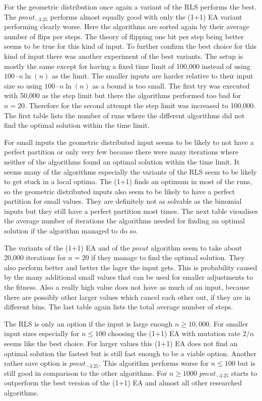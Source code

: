 For the geometric distribution once again a variant of the RLS performs the best.
The $pmut_{-3.25}$ performs almost equally good with only the (1+1) EA variant performing clearly worse.
Here the algorithms are sorted again by their average number of flips per steps.
The theory of flipping one bit per step being better seems to be true for this kind of input.\newline
To further confirm the best choice for this kind of input there was another experiment of the best variants.
The setup is mostly the same except for having a fixed time limit of 100,000 instead of using $100 \cdot n\ln(n)$ as the limit.
The smaller inputs are harder relative to their input size so using $100 \cdot n\ln(n)$ as a bound is too small.
The first try was executed with 50,000 as the step limit but there the algorithms performed too bad for $n=20$.
Therefore for the second attempt the step limit was increased to 100,000.
The first table lists the number of runs where the different algorithms did not find the optimal solution within the time limit.



For small inputs the geometric distributed input seems to be likely to not have a perfect partition or only very few because there were many iterations where neither of the algorithms found an optimal solution within the time limit.
It seems many of the algorithms especially the variants of the RLS seem to be likely to get stuck in a local optima.
The (1+1) finds an optimum in most of the runs, so the geometric distributed inputs also seem to be likely to have a perfect partition for small values.
They are definitely not as solvable as the binomial inputs but they still have a perfect partition most times.
The next table visualises the average number of iterations the algorithms needed for finding an optimal solution if the algorithm managed to do so.



The variants of the (1+1) EA and of the $pmut$ algorithm seem to take about 20,000 iterations for $n=20$ if they manage to find the optimal solution.
They also perform better and better the lager the input gets.
This is probability caused by the many additional small values that can be used for smaller adjustments to the fitness.
Also a really high value does not have as much of an input, because there are possibly other larger values which cancel each other out, if they are in different bins.
The last table again lists the total average number of steps.



The RLS is only an option if the input is large enough $n \ge 10,000$. For smaller input sizes especially for $n \le 100$ choosing the (1+1) EA with mutation rate $2/n$ seems like the best choice. For larger values this (1+1) EA does not find an optimal solution the fastest but is still fast enough to be a viable option. Another rather save option is $pmut_{-3.25}$. This algorithm performs worse for $n \le 100$ but is still good in comparison to the other algorithms. For $n \ge 1000$ $pmut_{-3.25}$ starts to outperform the best version of the (1+1) EA and almost all other researched algorithms.